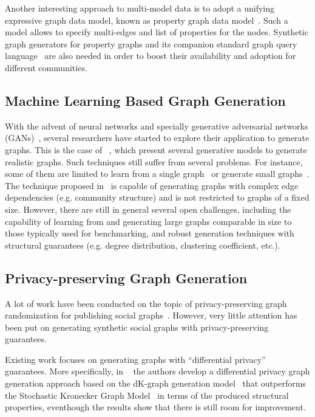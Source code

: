 Another interesting approach to multi-model data is to adopt a unifying
expressive graph data model, known as property graph data
model~\cite{BFVY18}. Such a model allows to specify multi-edges and list of
properties for the nodes. Synthetic graph generators for property graphs and its
companion standard graph query language~\cite{Angles18,AnglesABBFGLPPS18} are also needed in order to boost
their availability and adoption for different communities.


\subsection{Machine Learning Based Graph Generation}

With the advent of neural networks and specially generative adversarial networks
(GANs)~\cite{goodfellow2014generative}, several researchers have started to
explore their application to generate graphs. This is the case of
~\cite{kipf2016variational,grover2018graphite,simonovsky2018graphvae,li2018learning,you2018graphrnn},
which present several generative models to generate realistic graphs.  Such
techniques still suffer from several problems. For instance, some of them are
limited to learn from a single
graph~\cite{kipf2016variational,grover2018graphite} or generate small
graphs~\cite{simonovsky2018graphvae,li2018learning,you2018graphrnn}. The
technique proposed in~\cite{you2018graphrnn} is capable of generating graphs
with complex edge dependencies (e.g. community structure) and is not restricted
to graphs of a fixed size. However, there are still in general several open
challenges, including the capability of learning from and generating large graphs comparable
in size to those typically used for benchmarking, and robust generation
techniques with structural guarantees (e.g. degree distribution, clustering
coefficient, etc.).

\subsection{Privacy-preserving Graph Generation}

A lot of work have been conducted on the topic of privacy-preserving graph
randomization for publishing social graphs~\cite{wu2010survey}. However, very
little attention has been put on generating synthetic social graphs with
privacy-preserving guarantees. 

Existing work focuses on generating graphs with ``differential
privacy''~\cite{dwork2009differential} guarantees. More specifically, in
~\cite{wang2013preserving} the authors develop a differential privacy graph
generation approach based on the dK-graph generation
model~\cite{mahadevan2006systematic} that outperforms the Stochastic Kronecker
Graph Model~\cite{LeskovecCKF05} in terms of the produced structural properties,
eventhough the results show that there is still room for improvement.

